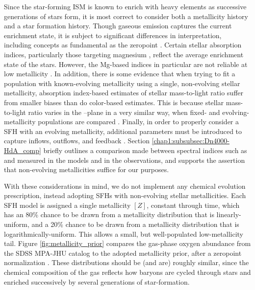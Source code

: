 Since the star-forming ISM is known to enrich with heavy elements as successive generations of stars form, it is most correct to consider both a metallicity history and a star formation history. Though gaseous emission captures the current enrichment state, it is subject to significant differences in interpretation, including concepts as fundamental as the zeropoint \citep{stasinska_07_review}. Certain stellar absorption indices, particularly those targeting magnesium \citep{barbuy_92}, reflect the average enrichment state of the stars. However, the Mg-based indices in particular are not reliable at low metallicity \citep{maraston_03b}. In addition, there is some evidence that when trying to fit a population with known-evolving metallicity using a single, non-evolving stellar metallicity, absorption index-based estimates of stellar mass-to-light ratio suffer from smaller biases than do color-based estimates. This is because stellar mass-to-light ratio varies in the \Dn--\HdeltaA plane in a very similar way, when fixed- and evolving-metallicity populations are compared \citep[see][Section 5]{gallazzi_bell_09}. Finally, in order to properly consider a SFH with an evolving metallicity, additional parameters must be introduced to capture inflows, outflows, and feedback \citep{matteucci_16_chemev}. Section \ref{chap1:subsubsec:Dn4000-HdA_comp} briefly outlines a comparison made between spectral indices such as \Dn and \HdeltaA measured in the models and in the observations, and supports the assertion that non-evolving metallicities suffice for our purposes.

With these considerations in mind, we do not implement any chemical evolution prescription, instead adopting SFHs with non-evolving stellar metallicities. Each SFH model is assigned a single metallicity $[Z]$, constant through time, which has an 80\% chance to be drawn from a metallicity distribution that is linearly-uniform, and a 20\% chance to be drawn from a metallicity distribution that is logarithmically-uniform. This allows a small, but well-populated low-metallicity tail. Figure \ref{fig:metallicity_prior} compares the gas-phase oxygen abundance from the SDSS MPA-JHU catalog \citep{tremonti_mz} to the adopted metallicity prior, after a zeropoint normalization \citep{asplund_09}. These distributions should be (and are) roughly similar, since the chemical composition of the gas reflects how baryons are cycled through stars and enriched successively by several generations of star-formation.

